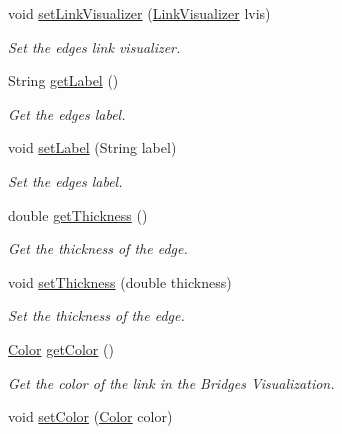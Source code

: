 \begin{DoxyCompactItemize}
\item 
void \mbox{\hyperlink{classbridges_1_1base_1_1_edge_a1bb8008507d26245468bf9d0f1452072}{set\+Link\+Visualizer}} (\mbox{\hyperlink{classbridges_1_1base_1_1_link_visualizer}{Link\+Visualizer}} lvis)
\begin{DoxyCompactList}\small\item\em Set the edge\textquotesingle{}s link visualizer. \end{DoxyCompactList}\item 
String \mbox{\hyperlink{classbridges_1_1base_1_1_edge_a8663708d930e8df460c57d8bdbab44b2}{get\+Label}} ()
\begin{DoxyCompactList}\small\item\em Get the edge\textquotesingle{}s label. \end{DoxyCompactList}\item 
void \mbox{\hyperlink{classbridges_1_1base_1_1_edge_ad5f1d55a3c8caeb975f497dfe4f29242}{set\+Label}} (String label)
\begin{DoxyCompactList}\small\item\em Set the edge\textquotesingle{}s label. \end{DoxyCompactList}\item 
double \mbox{\hyperlink{classbridges_1_1base_1_1_edge_a3431e83235fc5d5dd5cf747ed4853881}{get\+Thickness}} ()
\begin{DoxyCompactList}\small\item\em Get the thickness of the edge. \end{DoxyCompactList}\item 
void \mbox{\hyperlink{classbridges_1_1base_1_1_edge_ae8d87539f03f04479e5f5710ea9bf260}{set\+Thickness}} (double thickness)
\begin{DoxyCompactList}\small\item\em Set the thickness of the edge. \end{DoxyCompactList}\item 
\mbox{\hyperlink{classbridges_1_1base_1_1_color}{Color}} \mbox{\hyperlink{classbridges_1_1base_1_1_edge_a243d9e6a57ebb570dda81bffe0cd4b77}{get\+Color}} ()
\begin{DoxyCompactList}\small\item\em Get the color of the link in the Bridges Visualization. \end{DoxyCompactList}\item 
void \mbox{\hyperlink{classbridges_1_1base_1_1_edge_a77f6d36e94a3cbb8e478c85a1a6dad84}{set\+Color}} (\mbox{\hyperlink{classbridges_1_1base_1_1_color}{Color}} color)

\end{DoxyCompactItemize}

